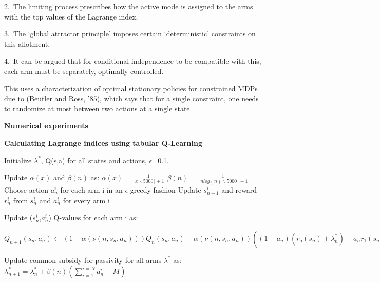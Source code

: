 \documentclass{slides}
\begin{document}
{2.\ The limiting process prescribes how the active mode is assigned to the arms with the top values of the Lagrange index. 

3.\ The `global attractor principle' imposes certain `deterministic' constraints on this allotment. 

4.\ It can be argued that for conditional independence to be compatible with this, each arm must be separately, optimally controlled. 

This uses a characterization of optimal stationary policies for constrained MDPs due to (Beutler and Ross, '85), which says that for a single constraint, one needs to randomize at most between two actions at a single state.



\newpage

{\large \color{144}

\begin{center}
\textbf{\Large Numerical experiments}
\end{center}
\newpage
\textbf{Calculating Lagrange indices using tabular Q-Learning}
\begin{algorithm}[H]
\begin{small}
\begin{algorithmic}[1]
    \State Initialize $\lambda^*$, Q(s,a) for all states and actions, $\epsilon$=0.1.


        \State Update $\alpha(x)$ and $\beta(n)$ as:
        $\alpha(x)=\frac{1}{\lceil{x\backslash5000}\rceil+1}$ $\beta(n)=\frac{1}{\lceil{nlog(n)\backslash5000}\rceil+1}$
        \State Choose action $a_{n}^i$ for each arm i in an $\epsilon$-greedy fashion
        \State Update $s_{n+1}^i$ and reward $r_n^i$ from $s_{n}^i$ and $a_{n}^i$ for every arm i
        
        \State Update ($s_n^i$,$a_n^i$) Q-values for each arm i as:
        \Statex\begin{small}$Q_{n+1}(s_n,a_n)\gets(1-\alpha(\nu(n,s_n,a_n)))Q_n(s_n,a_n)+\alpha(\nu(n,s_n,a_n))((1-a_n)(r_o(s_n)+\lambda_n^*)+a_nr_1(s_n)+\underset{v\epsilon\{0,1\}}{max}Q_n(s_{n+1},v)-\frac{1}{2d}\sum\limits_{k\in S}Q_n(k,0)+Q_n(k,1))$\end{small}
        \State Update common subsidy for passivity for all arms $\lambda^*$ as: $\lambda_{n+1}^*=\lambda_n^*+\beta(n)(\sum\limits_{i=1}^{i=N}a_n^i-M)$
        

\end{algorithmic}
\end{small}
\end{algorithm}}}
\end{document}
